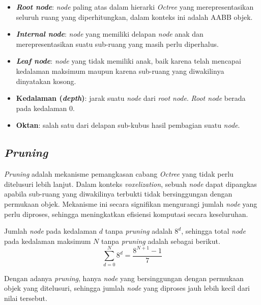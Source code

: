\begin{itemize}
    \item \textbf{\textit{Root node}}: \textit{node} paling atas dalam hierarki
          \textit{Octree} yang merepresentasikan seluruh ruang yang diperhitungkan,
          dalam konteks ini adalah AABB objek.

    \item \textbf{\textit{Internal node}}: \textit{node} yang memiliki delapan
          \textit{node} anak dan merepresentasikan suatu sub-ruang yang masih perlu
          diperhalus.

    \item \textbf{\textit{Leaf node}}: \textit{node} yang tidak memiliki anak,
          baik karena telah mencapai kedalaman maksimum maupun karena sub-ruang yang
          diwakilinya dinyatakan kosong.

    \item \textbf{Kedalaman (\textit{depth})}: jarak suatu \textit{node} dari
          \textit{root node}. \textit{Root node} berada pada kedalaman 0.

    \item \textbf{Oktan}: salah satu dari delapan sub-kubus hasil pembagian suatu
          \textit{node}.
\end{itemize}

\subsection{\textit{Pruning}}

\textit{Pruning} adalah mekanisme pemangkasan cabang \textit{Octree} yang tidak
perlu ditelusuri lebih lanjut. Dalam konteks \textit{voxelization}, sebuah
\textit{node} dapat dipangkas apabila sub-ruang yang diwakilinya terbukti tidak
bersinggungan dengan permukaan objek. Mekanisme ini secara signifikan mengurangi
jumlah \textit{node} yang perlu diproses, sehingga meningkatkan efisiensi
komputasi secara keseluruhan.

Jumlah \textit{node} pada kedalaman $d$ tanpa \textit{pruning} adalah $8^d$,
sehingga total \textit{node} pada kedalaman maksimum $N$ tanpa \textit{pruning}
adalah sebagai berikut.
\begin{equation}
    \sum_{d=0}^{N} 8^d = \frac{8^{N+1} - 1}{7}
\end{equation}

Dengan adanya \textit{pruning}, hanya \textit{node} yang bersinggungan dengan
permukaan objek yang ditelusuri, sehingga jumlah \textit{node} yang diproses
jauh lebih kecil dari nilai tersebut.

